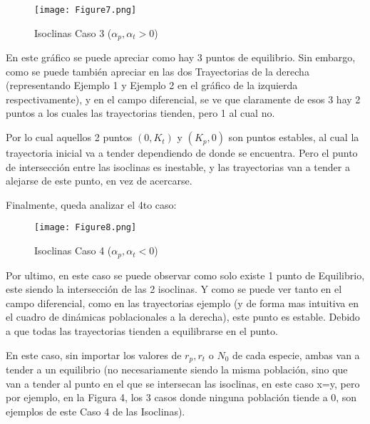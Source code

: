 \documentclass{article}
\begin{document}
\begin{figure}[ht]
    \centering
    \caption{Isoclinas Caso 3 ($\alpha_p, \alpha_t > 0$)}
    \texttt{[image: Figure7.png]}
    \label{fig:Image 1.1}
\end{figure}

\noindent En este gráfico se puede apreciar como hay 3 puntos de equilibrio. Sin embargo, como se puede también apreciar en las dos Trayectorias de la derecha (representando Ejemplo 1 y Ejemplo 2 en el gráfico de la izquierda respectivamente), y en el campo diferencial, se ve que claramente de esos 3 hay 2 puntos a los cuales las trayectorias tienden, pero 1 al cual no. \vspace{0.75\baselineskip}

\noindent Por lo cual aquellos 2 puntos $(0, K_t)$ y $(K_p, 0)$ son puntos estables, al cual la trayectoria inicial va a tender dependiendo de donde se encuentra. Pero el punto de intersección entre las isoclinas es inestable, y las trayectorias van a tender a alejarse de este punto, en vez de acercarse. \vspace{0.5\baselineskip}

\noindent Finalmente, queda analizar el 4to caso:

\begin{figure}[ht]
    \centering
    \caption{Isoclinas Caso 4 ($\alpha_p, \alpha_t < 0$)}
    \texttt{[image: Figure8.png]}
    \label{fig:Image 1.1}
\end{figure}

\noindent Por ultimo, en este caso se puede observar como solo existe 1 punto de Equilibrio, este siendo la intersección de las 2 isoclinas. Y como se puede ver tanto en el campo diferencial, como en las trayectorias ejemplo (y de forma mas intuitiva en el cuadro de dinámicas poblacionales a la derecha), este punto es estable. Debido a que todas las trayectorias tienden a equilibrarse en el punto. \vspace{\baselineskip}

\noindent En este caso, sin importar los valores de $r_p, r_t$ o $N_0$ de cada especie, ambas van a tender a un equilibrio (no necesariamente siendo la misma población, sino que van a tender al punto en el que se intersecan las isoclinas, en este caso x=y, pero por ejemplo, en la Figura 4, los 3 casos donde ninguna población tiende a 0, son ejemplos de este Caso 4 de las Isoclinas). 

\vspace{\baselineskip}
\end{document}
